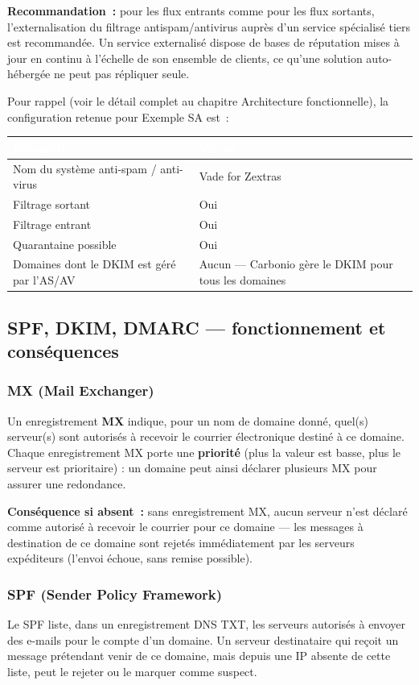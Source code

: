 \documentclass[11pt,a4paper]{report}
\newcommand{\tblhead}[1]{\textcolor{white}{\textbf{#1}}}
\begin{document}
\textbf{Recommandation~:} pour les flux entrants comme pour les flux sortants, l'externalisation du filtrage antispam/antivirus auprès d'un service spécialisé tiers est recommandée. Un service externalisé dispose de bases de réputation mises à jour en continu à l'échelle de son ensemble de clients, ce qu'une solution auto-hébergée ne peut pas répliquer seule.

Pour rappel (voir le détail complet au chapitre Architecture fonctionnelle), la configuration retenue pour Exemple SA est~:
\begin{longtable}{|p{7cm}|p{6cm}|}
\hline
\rowcolor{primary}\tblhead{Paramètre} & \tblhead{Valeur} \\
\hline
\endhead
Nom du système anti-spam / anti-virus & Vade for Zextras \\
\hline
Filtrage sortant & Oui \\
\hline
Filtrage entrant & Oui \\
\hline
Quarantaine possible & Oui \\
\hline
Domaines dont le DKIM est géré par l'AS/AV & Aucun --- Carbonio gère le DKIM pour tous les domaines \\
\hline
\end{longtable}

\subsection{SPF, DKIM, DMARC --- fonctionnement et conséquences}
\label{sec:dns-consequences}

\subsubsection{MX (Mail Exchanger)}
Un enregistrement \textbf{MX} indique, pour un nom de domaine donné, quel(s) serveur(s) sont autorisés à recevoir le courrier électronique destiné à ce domaine. Chaque enregistrement MX porte une \textbf{priorité} (plus la valeur est basse, plus le serveur est prioritaire) : un domaine peut ainsi déclarer plusieurs MX pour assurer une redondance.

\textbf{Conséquence si absent~:} sans enregistrement MX, aucun serveur n'est déclaré comme autorisé à recevoir le courrier pour ce domaine --- les messages à destination de ce domaine sont rejetés immédiatement par les serveurs expéditeurs (l'envoi échoue, sans remise possible).

\subsubsection{SPF (Sender Policy Framework)}
Le SPF liste, dans un enregistrement DNS TXT, les serveurs autorisés à envoyer des e-mails pour le compte d'un domaine. Un serveur destinataire qui reçoit un message prétendant venir de ce domaine, mais depuis une IP absente de cette liste, peut le rejeter ou le marquer comme suspect.
\end{document}
